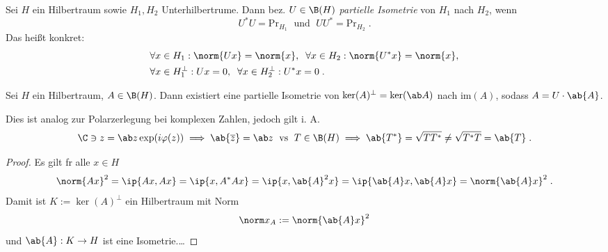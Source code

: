 \begin{definition}
	Sei $H$ ein Hilbertraum sowie \(H_1, H_2\) Unterhilbertr\as ume. Dann bez. \(U\in \B(H)\) \textit{partielle Isometrie} von $H_1$ nach $H_2$, wenn 
	\[U^*U = \text{Pr}_{H_1} \;\text{ und }\; UU^* = \text{Pr}_{H_2}\;.\]
	Das hei\ss{}t konkret:
	\begin{align*}&\forall x\in H_1: \norm{Ux} = \norm{x},\;\;\forall x \in H_2: \norm{U^*x} = \norm{x},\\
		&\forall x \in H_1^{\perp}: Ux = 0,\;\; \forall x \in H_2^\perp: U^*x = 0\;.\end{align*}
\end{definition}
\begin{theorem}
	Sei $H$ ein Hilbertraum, \(A\in \B(H)\). Dann existiert eine partielle Isometrie von \(\ker(A)^\perp = \ker(\ab A)\) nach \(\text{im}(A)\), sodass \(A = U\cdot \ab{A}\).
\end{theorem}
\begin{rem}
	Dies ist analog zur Polarzerlegung bei komplexen Zahlen, jedoch gilt i. A. 
	\[\C\ni z = \ab z \exp(i\varphi(z))\implies \ab{\overline z} = \ab z \;\text{ vs }\; T \in \B(H) \implies \ab{T^*} = \sqrt{TT^*} \neq \sqrt{T^*T} = \ab{T}\;.\]
\end{rem}
\begin{proof}
	Es gilt f\us r alle \(x\in H\)
	\[\norm{Ax}^2 = \ip{Ax, Ax} = \ip{x, A^*Ax} = \ip{x, \ab{A}^2 x} = \ip{\ab{A}x, \ab{A}x} = \norm{\ab{A}x}^2\;.\]
	Damit ist \(K:=\ker(A)^\perp\) ein Hilbertraum mit Norm 
	\[\norm x_A := \norm {\ab{A}x}^2\]
	und \(\ab{A}: K\to H\) ist eine Isometrie.\ldots
\end{proof}
